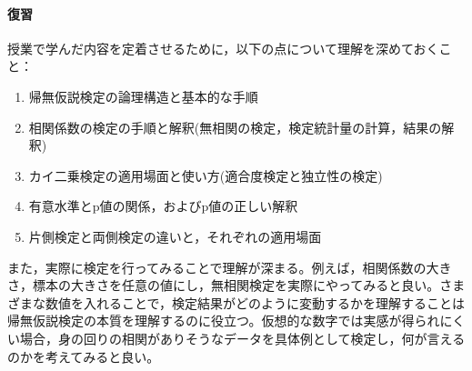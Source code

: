 \paragraph{復習}
授業で学んだ内容を定着させるために，以下の点について理解を深めておくこと：

\begin{enumerate}
\item 帰無仮説検定の論理構造と基本的な手順
\item 相関係数の検定の手順と解釈(無相関の検定，検定統計量の計算，結果の解釈)
\item カイ二乗検定の適用場面と使い方(適合度検定と独立性の検定)
\item 有意水準とp値の関係，およびp値の正しい解釈
\item 片側検定と両側検定の違いと，それぞれの適用場面
\end{enumerate}

また，実際に検定を行ってみることで理解が深まる。例えば，相関係数の大きさ，標本の大きさを任意の値にし，無相関検定を実際にやってみると良い。さまざまな数値を入れることで，検定結果がどのように変動するかを理解することは帰無仮説検定の本質を理解するのに役立つ。仮想的な数字では実感が得られにくい場合，身の回りの相関がありそうなデータを具体例として検定し，何が言えるのかを考えてみると良い。